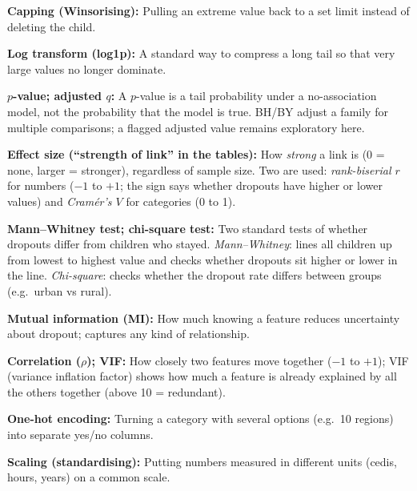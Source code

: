 \documentclass[conference,a4paper]{IEEEtran}
\begin{document}
{\noindent\textbf{Capping (Winsorising):} Pulling an extreme value back to a set limit instead of deleting the child.\par\vspace{2pt}
\noindent\textbf{Log transform (log1p):} A standard way to compress a long tail so that very large values no longer dominate.\par\vspace{2pt}
\noindent\textbf{$p$-value; adjusted $q$:} A $p$-value is a tail probability under a no-association model, not the probability that the model is true. BH/BY adjust a family for multiple comparisons; a flagged adjusted value remains exploratory here.\par\vspace{2pt}
\noindent\textbf{Effect size (``strength of link'' in the tables):} How \emph{strong} a link is (0 = none, larger = stronger), regardless of sample size. Two are used: \emph{rank-biserial $r$} for numbers ($-1$ to $+1$; the sign says whether dropouts have higher or lower values) and \emph{Cram\'er's $V$} for categories (0 to 1).\par\vspace{2pt}
\noindent\textbf{Mann--Whitney test; chi-square test:} Two standard tests of whether dropouts differ from children who stayed. \emph{Mann--Whitney}: lines all children up from lowest to highest value and checks whether dropouts sit higher or lower in the line. \emph{Chi-square}: checks whether the dropout rate differs between groups (e.g.\ urban vs rural).\par\vspace{2pt}
\noindent\textbf{Mutual information (MI):} How much knowing a feature reduces uncertainty about dropout; captures any kind of relationship.\par\vspace{2pt}
\noindent\textbf{Correlation ($\rho$); VIF:} How closely two features move together ($-1$ to $+1$); VIF (variance inflation factor) shows how much a feature is already explained by all the others together (above 10 = redundant).\par\vspace{2pt}
\noindent\textbf{One-hot encoding:} Turning a category with several options (e.g.\ 10 regions) into separate yes/no columns.\par\vspace{2pt}
\noindent\textbf{Scaling (standardising):} Putting numbers measured in different units (cedis, hours, years) on a common scale.\par\vspace{2pt}
}
\end{document}
